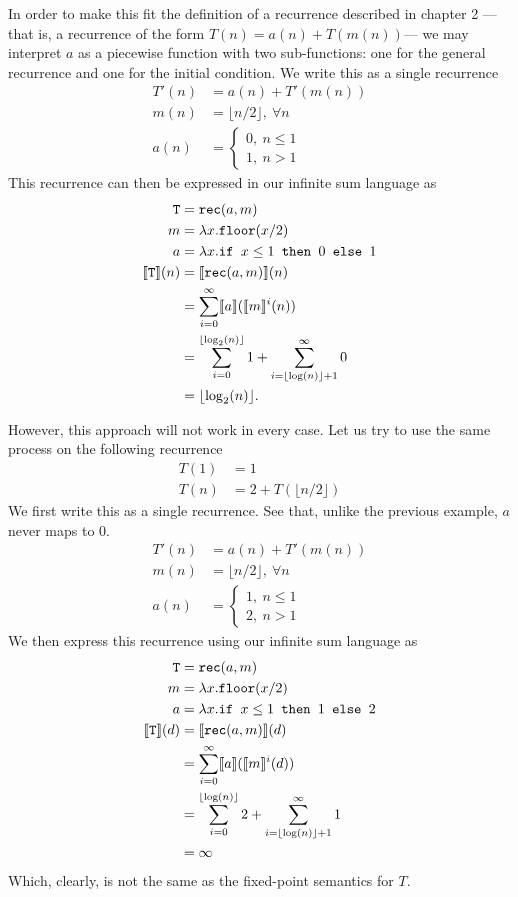  In order to make this fit the definition of a recurrence described in 
chapter 2 --- that is, a recurrence of the form $T(n) = a(n) + T(m(n))$--- we may interpret $a$ as a 
piecewise function with two sub-functions: one for the general recurrence and one for the initial condition.
We write this as a single recurrence
\begin{align*}
T'(n) &= a(n) + T'(m(n)) \\
m(n) &= \lfloor n/2 \rfloor, \ \forall n \\ 
a(n) &=
\begin{cases} 
0, \ n \leq 1 \\
1, \ n > 1
\end{cases}
\end{align*} 
This recurrence can then be expressed in our infinite sum language as 
\begin{align*}
\texttt{T} &= \texttt{rec}(a,m) \\
m &= \lambda x.\texttt{floor}(x/2) \\
a &= \lambda x.\texttt{if } x\leq 1 \texttt{ then } 0 \texttt{ else } 1 \\
\llbracket \texttt{T} \rrbracket(n) &= \llbracket \texttt{rec}(a,m) \rrbracket(n) \\
&= \sum_{i=0}^{\infty}\llbracket a \rrbracket(\llbracket m\rrbracket^i(n)) \\
&= \sum_{i=0}^{\lfloor \log_2(n) \rfloor} 1 + \sum_{i= \lfloor \log(n)\rfloor+1}^{\infty} 0 \\
&=\lfloor \log_2(n) \rfloor.
\end{align*}

However, this approach will not work in every case. Let us try to use the same process on the following recurrence
\begin{align*}
T(1) &= 1 \\
T(n) &= 2 + T(\lfloor n/2\rfloor) 
\end{align*}
We first write this as a single recurrence. See that, unlike the previous example, $a$ never maps to $0$.
\begin{align*}
T'(n) &= a(n) + T'(m(n)) \\
m(n) &= \lfloor n/2 \rfloor, \ \forall n \\ 
a(n) &= 
\begin{cases}
1, \ n \leq 1 \\
2, \ n > 1
\end{cases}
\end{align*}
We then express this recurrence using our infinite sum language as
\begin{align*}
\texttt{T} &= \texttt{rec}(a,m) \\
m &= \lambda x.\texttt{floor}(x/2) \\
a &=\lambda x.\texttt{if } x\leq1 \texttt{ then } 1 \texttt{ else } 2 \\
\llbracket \texttt{T} \rrbracket(d) &= \llbracket \texttt{rec}(a,m) \rrbracket(d) \\
&= \sum_{i=0}^{\infty}\llbracket a \rrbracket(\llbracket m\rrbracket^i(d)) \\
&= \sum_{i=0}^{\lfloor \log(n) \rfloor} 2 + \sum_{i=\lfloor \log(n) \rfloor+1 }^{\infty} 1 \\
&= \infty
\end{align*}
Which, clearly, is not the same as the fixed-point semantics for $T$.

